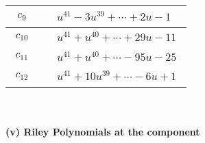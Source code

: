 \documentclass[1p]{elsarticle_modified}
\theoremstyle{definition}
\begin{document}
\begin{tabular}{m{50pt}|m{274pt}}
\hline $$\begin{aligned}c_{9}\end{aligned}$$&$\begin{aligned}
&u^{41}-3 u^{39}+\cdots+2 u-1
\end{aligned}$\\
\hline $$\begin{aligned}c_{10}\end{aligned}$$&$\begin{aligned}
&u^{41}+u^{40}+\cdots+29 u-11
\end{aligned}$\\
\hline $$\begin{aligned}c_{11}\end{aligned}$$&$\begin{aligned}
&u^{41}+u^{40}+\cdots-95 u-25
\end{aligned}$\\
\hline $$\begin{aligned}c_{12}\end{aligned}$$&$\begin{aligned}
&u^{41}+10 u^{39}+\cdots-6 u+1
\end{aligned}$\\
\hline
\end{tabular}\\~\\
\newpage\renewcommand{\arraystretch}{1}
\flushleft \textbf{(v) Riley Polynomials at the component}\newline \\
\end{document}
